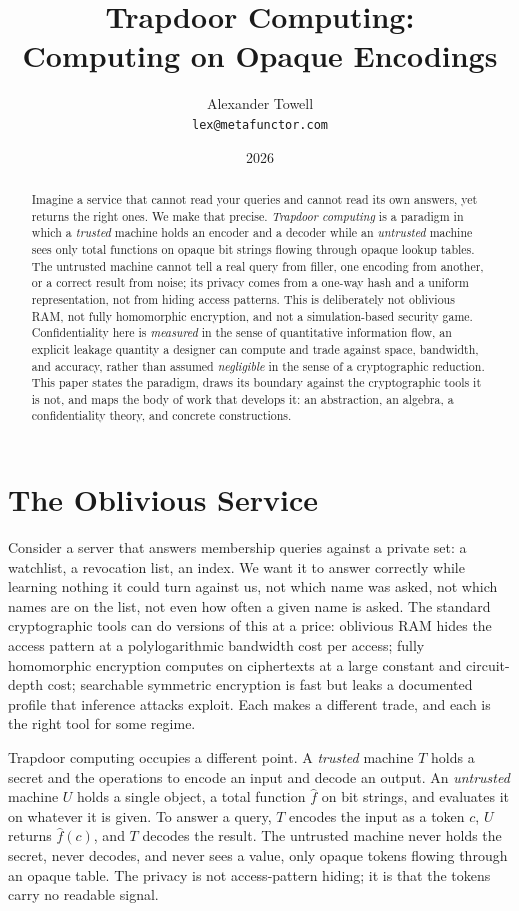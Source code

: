 \documentclass[11pt]{article}
\title{Trapdoor Computing:\\[0.2em]\large Computing on Opaque Encodings}
\author{Alexander Towell\\\texttt{lex@metafunctor.com}}
\date{2026}
\newcommand{\fhat}{\hat{f}}
\begin{document}
\maketitle

\begin{abstract}
Imagine a service that cannot read your queries and cannot read its own
answers, yet returns the right ones. We make that precise. \emph{Trapdoor
computing} is a paradigm in which a \emph{trusted} machine holds an encoder
and a decoder while an \emph{untrusted} machine sees only total functions on
opaque bit strings flowing through opaque lookup tables. The untrusted machine
cannot tell a real query from filler, one encoding from another, or a correct
result from noise; its privacy comes from a one-way hash and a uniform
representation, not from hiding access patterns. This is deliberately not
oblivious RAM, not fully homomorphic encryption, and not a simulation-based
security game. Confidentiality here is \emph{measured} in the sense of
quantitative information flow, an explicit leakage quantity a designer can
compute and trade against space, bandwidth, and accuracy, rather than assumed
\emph{negligible} in the sense of a cryptographic reduction. This paper states
the paradigm, draws its boundary against the cryptographic tools it is not,
and maps the body of work that develops it: an abstraction, an algebra, a
confidentiality theory, and concrete constructions.
\end{abstract}

\section{The Oblivious Service}
\label{sec:service}

Consider a server that answers membership queries against a private set: a
watchlist, a revocation list, an index. We want it to answer correctly while
learning nothing it could turn against us, not which name was asked, not which
names are on the list, not even how often a given name is asked. The standard
cryptographic tools can do versions of this at a price: oblivious RAM hides the
access pattern at a polylogarithmic bandwidth cost per access; fully
homomorphic encryption computes on ciphertexts at a large constant and circuit-%
depth cost; searchable symmetric encryption is fast but leaks a documented
profile that inference attacks exploit. Each makes a different trade, and each
is the right tool for some regime.

Trapdoor computing occupies a different point. A \emph{trusted} machine $T$
holds a secret and the operations to encode an input and decode an output. An
\emph{untrusted} machine $U$ holds a single object, a total function $\fhat$ on
bit strings, and evaluates it on whatever it is given. To answer a query, $T$
encodes the input as a token $c$, $U$ returns $\fhat(c)$, and $T$ decodes the
result. The untrusted machine never holds the secret, never decodes, and never
sees a value, only opaque tokens flowing through an opaque table. The privacy
is not access-pattern hiding; it is that the tokens carry no readable signal.
\end{document}
